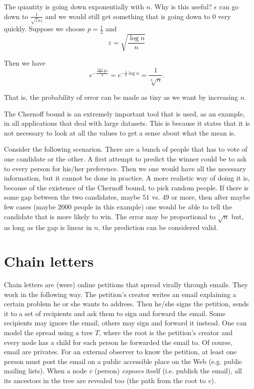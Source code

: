The quantity is going down exponentially with $n$. Why is this useful? $\epsilon$ can go down to $\frac{1}{\sqrt(n)}$ and we would still get something that is going down to $0$ very quickly. Suppose we choose $p = \frac{1}{2}$ and
\begin{equation}
	\varepsilon = \sqrt{\frac{\log n}{n}}
\end{equation}

Then we have
\[e^{-\frac{\frac{\log n}{n}\frac{1}{2}n}{3}} = e^{-\frac{1}{6}\log n} = \frac{1}{\sqrt[6]{n}}.\]

That is, the probability of error can be made as tiny as we want by increasing $n$.

The Chernoff bound is an extremely important tool that is used, as an example, in all applications that deal with large datasets. This is because it states that it is not necessary to look at all the values to get a sense about what the mean is. 

Consider the following scenarion. There are a bunch of people that has to vote of one candidate or the other. A first attempt to predict the winner could be to ask to every person for his/her preference. Then we one would have all the necessary information, but it cannot be done in practice. A more realistic way of doing it is, because of the existence of the Chernoff bound, to pick random people. If there is some gap between the two candidates, maybe $51$ vs. $49$ or more, then after maybe few cases (maybe $2000$ people in this example) one would be able to tell the candidate that is more likely to win. The error may be proportional to $\sqrt{n}$ but, as long as the gap is linear in $n$, the prediction can be considered valid.


\section{Chain letters}

Chain letters are (were) online petitions that spread virally through emails. They work in the following way. The petition's creator writes an email explaining a certain problem he or she wants to address. Then he/she signs the petition, sends it to a set of recipients and ask them to sign and forward the email. Some recipients may ignore the email, others may sign and forward it instead. One can model the spread using a tree $T$, where the root is the petition's creator and every node has a child for each person he forwarded the email to. Of course, email are privates. For an external observer to know the petition, at least one person must post the email on a public accessible place on the Web (e.g. public mailing lists). When a node $v$ (person) \emph{exposes} itself (i.e. publish the email), all its ancestors in the tree are revealed too (the path from the root to $v$).

